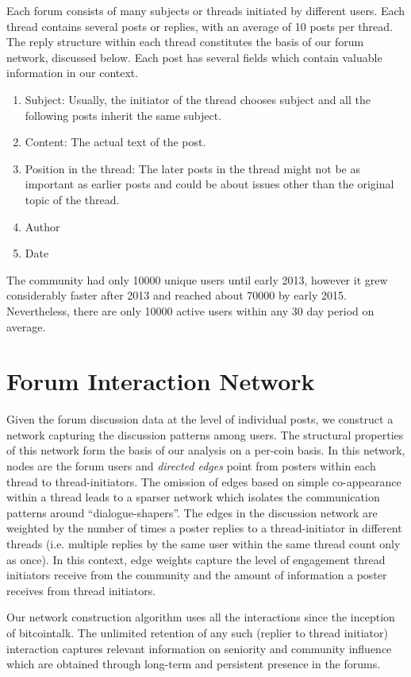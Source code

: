 Each forum consists of many subjects or threads initiated by different users.
Each thread contains several posts or replies, with an average of 10 posts per
thread.  The reply structure within each thread constitutes the basis of our
forum network, discussed below.  Each post has several fields which contain
valuable information in our context.
\begin{enumerate}
  \item{Subject:} Usually, the initiator of the thread chooses subject and all the
    following posts inherit the same subject.
  \item{Content:} The actual text of the post.
  \item{Position in the thread}: The later posts in the thread might not be as important
    as earlier posts and could be about issues other than the original topic of the thread.
  \item{Author}
  \item{Date}
\end{enumerate}

The community had only 10000 unique users until early 2013, however it grew considerably faster after 2013 and reached about 70000 by early 2015.
Nevertheless, there are only 10000 active users within any 30 day period on average.


\section{Forum Interaction Network}

Given the forum discussion data at the level of individual posts, we  construct a network capturing the discussion patterns among users. The structural properties of this network form the basis of our analysis on a per-coin basis. In this network, nodes are the forum users and \textit{directed edges} point from posters within each thread to thread-initiators. The omission of edges based on simple co-appearance within a thread leads to a sparser network which isolates the communication patterns around ``dialogue-shapers''. The edges in the discussion network are weighted by the number of times a poster replies to a thread-initiator in different threads (i.e. multiple replies by the same user within the same thread count only as once).
In this context, edge weights capture the level of engagement thread initiators receive from the community and the amount of information a poster receives from thread initiators.

Our network construction algorithm uses all the interactions since the inception of bitcointalk. The unlimited retention of any such (replier to thread initiator) interaction captures relevant information on seniority and community influence which are obtained through long-term and persistent presence in the forums. 

